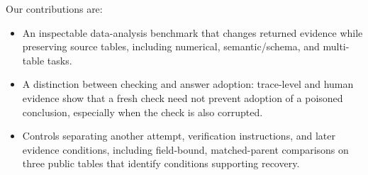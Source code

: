 Our contributions are:
\begin{itemize}
    \item An inspectable data-analysis benchmark that changes returned evidence while preserving source tables, including numerical, semantic/schema, and multi-table tasks.
    \item A distinction between checking and answer adoption: trace-level and human evidence show that a fresh check need not prevent adoption of a poisoned conclusion, especially when the check is also corrupted.
    \item Controls separating another attempt, verification instructions, and later evidence conditions, including field-bound, matched-parent comparisons on three public tables that identify conditions supporting recovery.
\end{itemize}
